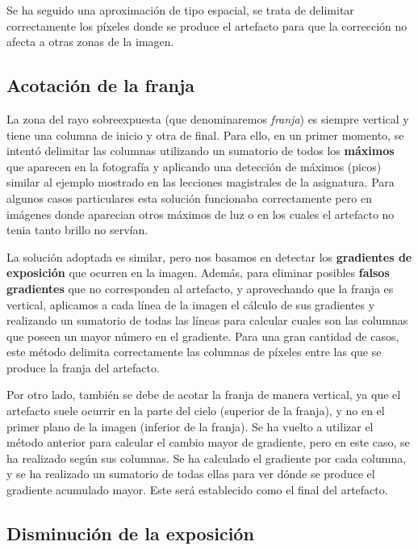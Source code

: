 \documentclass[11pt]{article}
\begin{document}
Se ha seguido una aproximación de tipo espacial, se trata de delimitar
correctamente los píxeles donde se produce el artefacto para que la
corrección no afecta a otras zonas de la imagen.

\hypertarget{acotaciuxf3n-de-la-franja}{%
\subsection{Acotación de la franja}\label{acotaciuxf3n-de-la-franja}}

La zona del rayo sobreexpuesta (que denominaremos \emph{franja}) es
siempre vertical y tiene una columna de inicio y otra de final. Para
ello, en un primer momento, se intentó delimitar las columnas utilizando
un sumatorio de todos los \textbf{máximos} que aparecen en la fotografía
y aplicando una detección de máximos (picos) similar al ejemplo mostrado
en las lecciones magistrales de la asignatura. Para algunos casos
particulares esta solución funcionaba correctamente pero en imágenes
donde aparecian otros máximos de luz o en los cuales el artefacto no
tenia tanto brillo no servían.

La solución adoptada es similar, pero nos basamos en detectar los
\textbf{gradientes de exposición} que ocurren en la imagen. Además, para
eliminar posibles \textbf{falsos gradientes} que no corresponden al
artefacto, y aprovechando que la franja es vertical, aplicamos a cada
línea de la imagen el cálculo de sus gradientes y realizando un
sumatorio de todas las líneas para calcular cuales son las columnas que
poseen un mayor número en el gradiente. Para una gran cantidad de casos,
este método delimita correctamente las columnas de píxeles entre las que
se produce la franja del artefacto.

Por otro lado, también se debe de acotar la franja de manera vertical,
ya que el artefacto suele ocurrir en la parte del cielo (superior de la
franja), y no en el primer plano de la imagen (inferior de la franja).
Se ha vuelto a utilizar el método anterior para calcular el cambio mayor
de gradiente, pero en este caso, se ha realizado según sus columnas. Se
ha calculado el gradiente por cada columna, y se ha realizado un
sumatorio de todas ellas para ver dónde se produce el gradiente
acumulado mayor. Este será establecido como el final del artefacto.

\hypertarget{disminuciuxf3n-de-la-exposiciuxf3n}{%
\subsection{Disminución de la
exposición}\label{disminuciuxf3n-de-la-exposiciuxf3n}}
\end{document}
